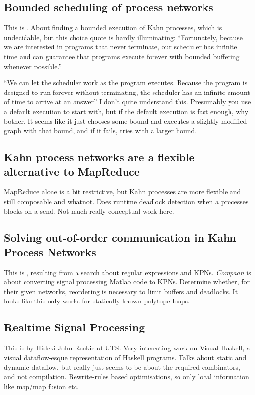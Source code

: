 \subsection{Bounded scheduling of process networks}
This is \cite{parks1995bounded}.
About finding a bounded execution of Kahn processes, which is undecidable, but this choice quote is hardly illuminating:
``Fortunately, because we are interested in programs that never terminate, our scheduler has infinite time and can guarantee that programs execute forever with bounded buffering whenever
possible.''

``We can let the scheduler work as the program executes. Because the program is designed to run forever without terminating, the scheduler has an infinite amount of time to arrive at an answer''
I don't quite understand this. Presumably you use a default execution to start with, but if the default execution is fast enough, why bother.
It seems like it just chooses some bound and executes a slightly modified graph with that bound, and if it fails, tries with a larger bound.

\subsection{Kahn process networks are a flexible alternative to MapReduce}
MapReduce alone is a bit restrictive, but Kahn processes are more flexible and still composable and whatnot\cite{vrba2009kahn}.
Does runtime deadlock detection when a processes blocks on a send.
Not much really conceptual work here.


\subsection{Solving out-of-order communication in Kahn Process Networks}
This is \cite{turjan2002compile}, resulting from a search about regular expressions and KPNs.
\emph{Compaan} is about converting signal processing Matlab code to KPNs.
Determine whether, for their given networks, reordering is necessary to limit buffers and deadlocks.
It looks like this only works for statically known polytope loops.

\subsection{Realtime Signal Processing}
This is \cite{reekie1995realtime} by Hideki John Reekie at UTS.
Very interesting work on Visual Haskell, a visual dataflow-esque representation of Haskell programs.
Talks about static and dynamic dataflow, but really just seems to be about the required combinators, and not compilation.
Rewrite-rules based optimisations, so only local information like map/map fusion etc.

